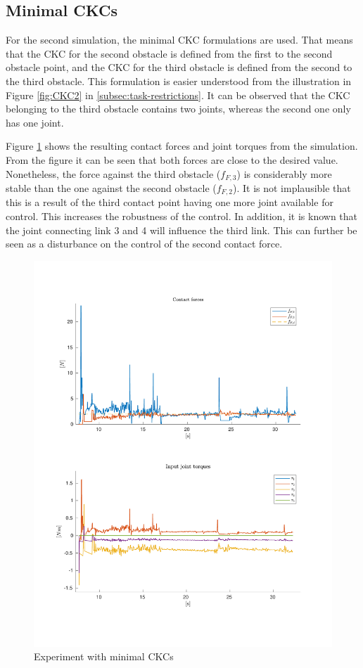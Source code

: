 \subsection{Minimal CKCs}

For the second simulation, the minimal CKC formulations are used. That means that the CKC for the second obstacle is defined from the first to the second obstacle point, and the CKC for the third obstacle is defined from the second to the third obstacle. This formulation is easier understood from the illustration in Figure \ref{fig:CKC2} in \ref{subsec:task-restrictions}. It can be observed that the CKC belonging to the third obstacle contains two joints, whereas the second one only has one joint.

Figure \ref{fig:2xf-miniJ} shows the resulting contact forces and joint torques from the simulation. From the figure it can be seen that both forces are close to the desired value. Nonetheless, the force against the third obstacle ($f_{F,3}$) is considerably more stable than the one against the second obstacle ($f_{F,2}$). It is not implausible that this is a result of the third contact point having one more joint available for control. This increases the robustness of the control. In addition, it is known that the joint connecting link 3 and 4 will influence the third link. This can further be seen as a disturbance on the control of the second contact force.

\begin{figure}
    \centering
    \includegraphics[trim=2cm 2cm 2cm 2cm, clip=true, width=\textwidth]{figures/experiments/2xf/miniJ-2plot.pdf}
    \caption{Experiment with minimal CKCs}
    \label{fig:2xf-miniJ}
\end{figure}

